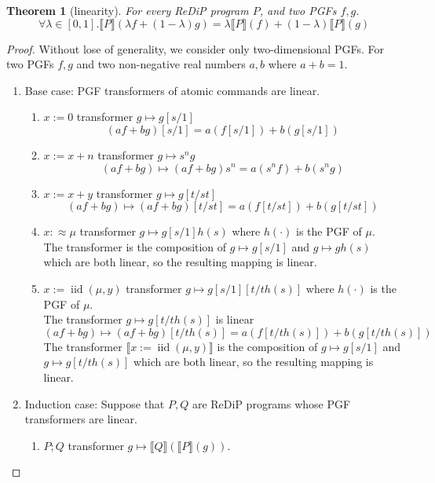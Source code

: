 \documentclass[a4paper]{article}
\DeclareMathOperator*{\iid}{iid}
\renewcommand{\S}[1]{ \llbracket #1 \rrbracket }
\newtheorem{theorem}{Theorem}[section]
\begin{document}
\begin{theorem}[linearity]
	For every ReDiP program \(P\), and two PGFs \(f,g\).
	\[
		\forall \lambda\in[0,1] . \S{P}(\lambda f + (1-\lambda) g) = \lambda \S{P}(f) + (1-\lambda)\S{P}(g)
	\]
\end{theorem}
\begin{proof}
	Without lose of generality, we consider only two-dimensional PGFs.
	For two PGFs \(f,g\) and two non-negative real numbers \(a,b\) where \(a+b=1\).
	\begin{enumerate}
		\item Base case: PGF transformers of atomic commands are linear.
		      \begin{enumerate}
			      \item \(x := 0\) transformer \(g\mapsto g[s/1]\)
			            \[
				            (af + bg)[s/1] = a(f[s/1]) + b(g[s/1])
			            \]
			      \item \(x := x+n\) transformer \(g\mapsto s^n g\)
			            \[
				            (af + bg) \mapsto (af + bg)s^n = a(s^n f) + b(s^n g)
			            \]
			      \item \(x := x+y\) transformer \(g\mapsto g[t/st]\)
			            \[
				            (af + bg) \mapsto (af + bg)[t/st] = a(f[t/st]) + b(g[t/st])
			            \]
			      \item \(x :\approx \mu\) transformer \(g\mapsto g[s/1]h(s)\) where \(h(\cdot)\) is the PGF of \(\mu\).\\
			            The transformer is the composition of \(g\mapsto g[s/1]\) and \(g\mapsto g h(s)\) which are both linear,
			            so the resulting mapping is linear.
			      \item \(x := \iid(\mu,y) \) transformer \(g\mapsto g[s/1][t/th(s)]\) where \(h(\cdot)\) is the PGF of \(\mu\).\\
			            The transformer \(g\mapsto g[t/t h(s)]\) is linear
			            \[
				            (af + bg) \mapsto (af + bg)[t/t h(s)] = a(f[t/t h(s)]) + b(g[t/t h(s)])
			            \]
			            The transformer \(\S{x := \iid(\mu,y)}\) is the composition of \(g\mapsto g[s/1]\) and \(g\mapsto g[t/t h(s)]\) which are both linear, so the resulting mapping is linear.
		      \end{enumerate}
		\item Induction case: Suppose that \(P,Q\) are ReDiP programs whose PGF transformers are linear.
		      \begin{enumerate}
			      \item \(P;Q\) transformer \(g\mapsto \S{Q}(\S{P}(g))\).

\end{enumerate}
\end{enumerate}
\end{proof}
\end{document}
